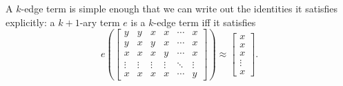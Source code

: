A $k$-edge term is simple enough that we can write out the identities it satisfies explicitly: a $k+1$-ary term $e$ is a $k$-edge term iff it satisfies
\[
e\left(\begin{bmatrix}y & y & x & x & \cdots & x\\ y & x & y & x & \cdots & x\\ x & x & x & y & \cdots & x\\ \vdots & \vdots & \vdots & \vdots & \ddots & \vdots \\ x & x & x & x & \cdots & y \end{bmatrix}\right) \approx \begin{bmatrix}x\\ x\\ x\\ \vdots \\ x\end{bmatrix}.
\]

